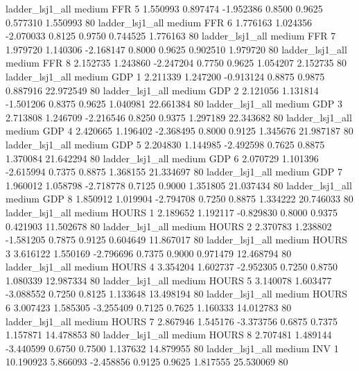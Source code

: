        ladder_lsj1_all     medium      FFR                 5  1.550993 0.897474 -1.952386 0.8500 0.9625  0.577310    1.550993 80
       ladder_lsj1_all     medium      FFR                 6  1.776163 1.024356 -2.070033 0.8125 0.9750  0.744525    1.776163 80
       ladder_lsj1_all     medium      FFR                 7  1.979720 1.140306 -2.168147 0.8000 0.9625  0.902510    1.979720 80
       ladder_lsj1_all     medium      FFR                 8  2.152735 1.243860 -2.247204 0.7750 0.9625  1.054207    2.152735 80
       ladder_lsj1_all     medium      GDP                 1  2.211339 1.247200 -0.913124 0.8875 0.9875  0.887916   22.972549 80
       ladder_lsj1_all     medium      GDP                 2  2.121056 1.131814 -1.501206 0.8375 0.9625  1.040981   22.661384 80
       ladder_lsj1_all     medium      GDP                 3  2.713808 1.246709 -2.216546 0.8250 0.9375  1.297189   22.343682 80
       ladder_lsj1_all     medium      GDP                 4  2.420665 1.196402 -2.368495 0.8000 0.9125  1.345676   21.987187 80
       ladder_lsj1_all     medium      GDP                 5  2.204830 1.144985 -2.492598 0.7625 0.8875  1.370084   21.642294 80
       ladder_lsj1_all     medium      GDP                 6  2.070729 1.101396 -2.615994 0.7375 0.8875  1.368155   21.334697 80
       ladder_lsj1_all     medium      GDP                 7  1.960012 1.058798 -2.718778 0.7125 0.9000  1.351805   21.037434 80
       ladder_lsj1_all     medium      GDP                 8  1.850912 1.019904 -2.794708 0.7250 0.8875  1.334222   20.746033 80
       ladder_lsj1_all     medium    HOURS                 1  2.189652 1.192117 -0.829830 0.8000 0.9375  0.421903   11.502678 80
       ladder_lsj1_all     medium    HOURS                 2  2.370783 1.238802 -1.581205 0.7875 0.9125  0.604649   11.867017 80
       ladder_lsj1_all     medium    HOURS                 3  3.616122 1.550169 -2.796696 0.7375 0.9000  0.971479   12.468794 80
       ladder_lsj1_all     medium    HOURS                 4  3.354204 1.602737 -2.952305 0.7250 0.8750  1.080339   12.987334 80
       ladder_lsj1_all     medium    HOURS                 5  3.140078 1.603477 -3.088552 0.7250 0.8125  1.133648   13.498194 80
       ladder_lsj1_all     medium    HOURS                 6  3.007423 1.585305 -3.255409 0.7125 0.7625  1.160333   14.012783 80
       ladder_lsj1_all     medium    HOURS                 7  2.867946 1.545176 -3.373756 0.6875 0.7375  1.157871   14.478853 80
       ladder_lsj1_all     medium    HOURS                 8  2.707481 1.489144 -3.440599 0.6750 0.7500  1.137632   14.879955 80
       ladder_lsj1_all     medium      INV                 1 10.190923 5.866093 -2.458856 0.9125 0.9625  1.817555   25.530069 80

